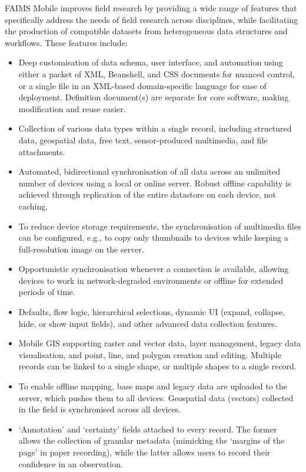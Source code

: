 \documentclass[preprint,12pt, a4paper]{elsarticle}
\begin{document}
FAIMS Mobile improves field research by providing a wide range of features that specifically address the needs of field research across disciplines, while facilitating the production of compatible datasets from  heterogeneous data structures and workflows. These features include:
\begin{itemize}
\item Deep customisation of data schema, user interface, and automation using either a packet of XML, Beanshell, and CSS documents for nuanced control, or a single file in an XML-based domain-specific language for ease of deployment. Definition document(s) are separate for core software, making modification and reuse easier.
\item Collection of various data types within a single record, including structured data, geospatial data, free text, sensor-produced multimedia, and file attachments.
\item Automated, bidirectional synchronisation of all data across an unlimited number of devices using a local or online server. Robust offline capability is achieved through replication of the entire datastore on each device, not caching. 
\item To reduce device storage requirements, the synchronisation of multimedia files can be configured, e.g., to copy only thumbnails to devices while keeping a full-resolution image on the server.
\item Opportunistic synchronisation whenever a connection is available, allowing devices to work in network-degraded environments or offline for extended periods of time. 
\item Defaults, flow logic, hierarchical selections, dynamic UI (expand, collapse, hide, or show input fields), and other advanced data collection features.
\item Mobile GIS supporting raster and vector data, layer management, legacy data visualisation, and point, line, and polygon creation and editing. Multiple records can be linked to a single shape, or multiple shapes to a single record.
\item To enable offline mapping, base maps and legacy data are uploaded to the server, which pushes them to all devices. Geospatial data (vectors) collected in the field is synchronised across all devices. 
\item `Annotation' and `certainty' fields attached to every record. The former allows the collection of granular metadata (mimicking the `margins of the page' in paper recording), while the latter allows users to record their confidence in an observation. 

\end{itemize}
\end{document}
